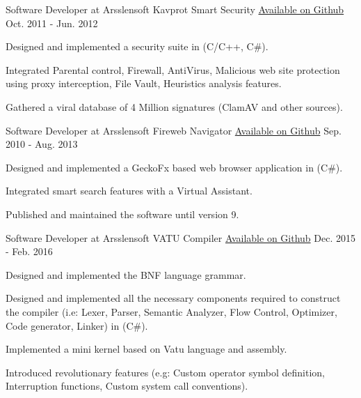 \begin{cventries}
  \cventry
    {Software Developer at Arsslensoft} %
    {Kavprot Smart Security} %
    {\href{https://github.com/Arsslensoft/Kavprot-Smart-Security}{Available on Github}} %
    {Oct. 2011 - Jun. 2012} %
    {
      \begin{cvitems} %
	\item {Designed and implemented a security suite in (C/C++, C\#).}
  \item {Integrated Parental control, Firewall, AntiVirus, Malicious web site protection using proxy interception, File Vault, Heuristics analysis features.}
  \item {Gathered a viral database of 4 Million signatures (ClamAV and other sources).}
      \end{cvitems}
    }


  \cventry
    {Software Developer at Arsslensoft} %
    {Fireweb Navigator} %
    {\href{https://github.com/Arsslensoft/Fireweb-Navigator}{Available on Github}} %
    {Sep. 2010 - Aug. 2013} %
    {
      \begin{cvitems} %
	\item {Designed and implemented a GeckoFx based web browser application in (C\#).}
  \item {Integrated smart search features with a Virtual Assistant.}
  \item {Published and maintained the software until version 9.}
      \end{cvitems}
    }


  \cventry
    {Software Developer at Arsslensoft} %
    {VATU Compiler} %
    {\href{https://github.com/Arsslensoft/Vatu}{Available on Github}} %
    {Dec. 2015 - Feb. 2016} %
    {
      \begin{cvitems} %
	\item {Designed and implemented the BNF language grammar.}
  \item {Designed and implemented all the necessary components required to construct the compiler (i.e: Lexer, Parser, Semantic Analyzer, Flow Control, Optimizer, Code generator, Linker) in  (C\#).}
  \item{Implemented a mini kernel based on Vatu language and assembly.} 
  \item {Introduced revolutionary features (e.g: Custom operator symbol definition, Interruption functions, Custom system call conventions).}
      \end{cvitems}
    }

\end{cventries}